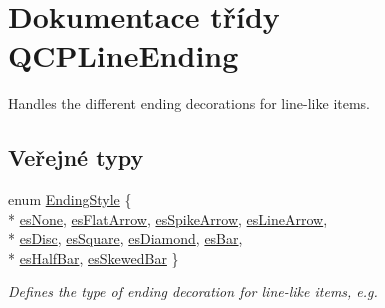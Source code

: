 \hypertarget{classQCPLineEnding}{}\section{Dokumentace třídy Q\+C\+P\+Line\+Ending}
\label{classQCPLineEnding}


Handles the different ending decorations for line-\/like items.  


\subsection*{Veřejné typy}
\begin{DoxyCompactItemize}
\item 
enum \hyperlink{classQCPLineEnding_a5ef16e6876b4b74959c7261d8d4c2cd5}{Ending\+Style} \{ \\*
\hyperlink{classQCPLineEnding_a5ef16e6876b4b74959c7261d8d4c2cd5aca12d500f50cd6871766801bac30fb03}{es\+None}, 
\hyperlink{classQCPLineEnding_a5ef16e6876b4b74959c7261d8d4c2cd5a3d7dcea2f100671727c3417142154f8f}{es\+Flat\+Arrow}, 
\hyperlink{classQCPLineEnding_a5ef16e6876b4b74959c7261d8d4c2cd5ab9964d0d03f812d1e79de15edbeb2cbf}{es\+Spike\+Arrow}, 
\hyperlink{classQCPLineEnding_a5ef16e6876b4b74959c7261d8d4c2cd5a61f78ee8f375fb21cb9d250687bbcbd2}{es\+Line\+Arrow}, 
\\*
\hyperlink{classQCPLineEnding_a5ef16e6876b4b74959c7261d8d4c2cd5ae5a3414916817258bcc6dddd605e8f5c}{es\+Disc}, 
\hyperlink{classQCPLineEnding_a5ef16e6876b4b74959c7261d8d4c2cd5ae1836502fa43d8990bb62b2d493a140a}{es\+Square}, 
\hyperlink{classQCPLineEnding_a5ef16e6876b4b74959c7261d8d4c2cd5a378fe5a8b768411b0bc1765210fe7200}{es\+Diamond}, 
\hyperlink{classQCPLineEnding_a5ef16e6876b4b74959c7261d8d4c2cd5a2cf543bbca332df26d89bf779f50469f}{es\+Bar}, 
\\*
\hyperlink{classQCPLineEnding_a5ef16e6876b4b74959c7261d8d4c2cd5a126c390f0c359fcd8df1fc5e38d26d5b}{es\+Half\+Bar}, 
\hyperlink{classQCPLineEnding_a5ef16e6876b4b74959c7261d8d4c2cd5a2b2cc96e757ca9bcd91fb70221ed43ab}{es\+Skewed\+Bar}
 \}\begin{DoxyCompactList}\small\item\em Defines the type of ending decoration for line-\/like items, e.\+g. \end{DoxyCompactList}
\end{DoxyCompactItemize}
